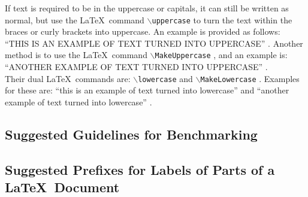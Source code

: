 \documentclass[letter,12pt]{article}
\begin{document}
If text is required to be in the uppercase or capitals, it can still be written as normal, but use the \LaTeX\ command {\tt $\backslash$uppercase} to turn the text within the braces or curly brackets into uppercase. An example is provided as follows: ``\uppercase{This is an Example of Text Turned into UpperCase}'' \cite[\S8.2.4, pp. 239]{Syropoulos2003}. Another method is to use the \LaTeX\ command {\tt $\backslash$MakeUppercase} \cite[\S Appendix G.1, pp. 512]{Kopka2004}, and an example is: ``\MakeUppercase{Another Example of Text Turned into UpperCase}'' \cite[\S6.8, pp. 47; \S23.2, pp. 212--213]{Greenwade2022} \cite[\S2.2.2, pp. 31; \S3.1.5, pp. 85--87; \S3.1.7, pp. 91; \S4.4.2, pp. 229; \S9.4.1, pp. 571]{Mittelbach2004} \cite[\S3.5, pp. 60]{Syropoulos2003} \cite[\S5, Changing Letter Case]{Ying20XY}. \\

Their dual \LaTeX\ commands are: {\tt $\backslash$lowercase} and {\tt $\backslash$MakeLowercase} \cite[\S Appendix G.1, pp. 512]{Kopka2004}. Examples for these are: ``\lowercase{This is an Example of Text Turned into LowerCase}'' \cite[\S8.2.4, pp. 239]{Syropoulos2003} and ``\MakeLowercase{Another Example of Text Turned into LowerCase}'' \cite[\S23.2, pp. 212--213]{Greenwade2022} \cite[\S2.2.6, pp. 37; \S3.1.5, pp. 85--87; \S7.3.1, pp. 341; \S9.4.1, pp. 571]{Mittelbach2004} \cite[\S3.5, pp. 60]{Syropoulos2003} \cite[\S5, Changing Letter Case]{Ying20XY}.





\subsection{Suggested Guidelines for Benchmarking}
\label{ssec:SuggestedGuidelinesForBenchmarking}









\subsection{Suggested Prefixes for Labels of Parts of a \LaTeX\ Document}
\label{ssec:SuggestedPrefixesForLabelsOfPartsOfALaTeXDocument}
\end{document}

